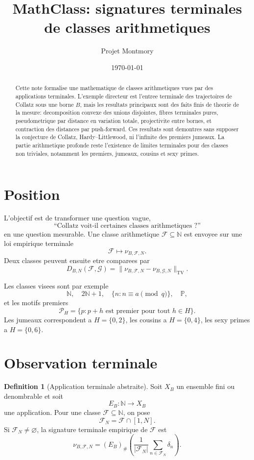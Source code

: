 \documentclass[11pt]{article}
\title{MathClass: signatures terminales de classes arithmetiques}
\author{Projet Montmory}
\date{\today}
\theoremstyle{plain}
\theoremstyle{definition}
\newtheorem{definition}[theorem]{Definition}
\theoremstyle{remark}
\newcommand{\N}{\mathbb N}
\newcommand{\Pp}{\mathbb P}
\newcommand{\TV}{\mathrm{TV}}
\newcommand{\1}{\mathbf 1}
\newcommand{\F}{\mathcal F}
\newcommand{\G}{\mathcal G}
\newcommand{\push}{_{\#}}
\begin{document}
\maketitle

\begin{abstract}
Cette note formalise une mathematique de classes arithmetiques vues par des
applications terminales. L'exemple directeur est l'entree terminale des
trajectoires de Collatz sous une borne \(B\), mais les resultats principaux sont
des faits finis de theorie de la mesure: decomposition convexe des unions
disjointes, fibres terminales pures, pseudometrique par distance en variation
totale, projectivite entre bornes, et contraction des distances par
push-forward. Ces resultats sont demontres sans supposer la conjecture de
Collatz, Hardy--Littlewood, ni l'infinite des premiers jumeaux. La partie
arithmetique profonde reste l'existence de limites terminales pour des classes
non triviales, notamment les premiers, jumeaux, cousins et sexy primes.
\end{abstract}

\section{Position}

L'objectif est de transformer une question vague,
\[
\text{``Collatz voit-il certaines classes arithmetiques ?''}
\]
en une question mesurable. Une classe arithmetique \(\F\subseteq\N\) est envoyee
sur une loi empirique terminale
\[
\F\longmapsto \nu_{B,\F,N}.
\]
Deux classes peuvent ensuite etre comparees par
\[
D_{B,N}(\F,\G)=\|\nu_{B,\F,N}-\nu_{B,\G,N}\|_{\TV}.
\]

Les classes visees sont par exemple
\[
\N,\quad 2\N+1,\quad \{n:n\equiv a\pmod q\},\quad \Pp,
\]
et les motifs premiers
\[
\mathcal P_H=\{p:p+h\text{ est premier pour tout }h\in H\}.
\]
Les jumeaux correspondent a \(H=\{0,2\}\), les cousins a \(H=\{0,4\}\), les
sexy primes a \(H=\{0,6\}\).

\section{Observation terminale}

\begin{definition}[Application terminale abstraite]
Soit \(X_B\) un ensemble fini ou denombrable et soit
\[
E_B:\N\to X_B
\]
une application. Pour une classe \(\F\subseteq\N\), on pose
\[
\F_N=\F\cap[1,N].
\]
Si \(\F_N\ne\varnothing\), la signature terminale empirique de \(\F\) est
\[
\nu_{B,\F,N}
=
(E_B)\push\left(
\frac{1}{|\F_N|}
\sum_{n\in\F_N}\delta_n
\right).
\]
\end{definition}
\end{document}
